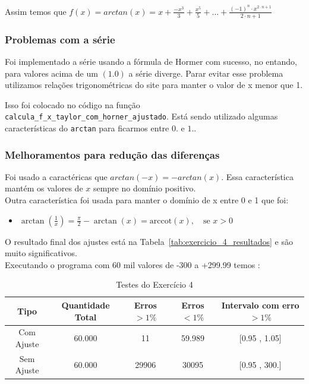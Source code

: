 Assim temos que $f(x) = arctan(x) = x + \frac{-x^3}{3} + \frac{x^5}{5} + ... + \frac{(-1)^n \cdot x^{2 \cdot n + 1}}{2 \cdot n + 1} $

\subsubsection{Problemas com a série}

Foi implementado a série usando a fórmula de Hormer com sucesso, no entando, para valores acima de um $(1.0)$ a série diverge.
Parar evitar esse problema utilizamos relações trigonométricas do site \cite{site-geek} para manter o valor de x menor que 1.

Isso foi colocado no código na função \texttt{calcula\_f\_x\_taylor\_com\_horner\_ajustado}. Está sendo utilizado algumas características do \texttt{arctan} para ficarmos entre $0.$ e $1.$.

\subsubsection{Melhoramentos para redução das diferenças}
\label{sec:melhoramentos-serie-arctan}
Foi usado a caractéricas que $arctan(-x) = -arctan(x)$. Essa característica mantém os valores de $x$ sempre no domínio positivo.\\
Outra característica foi usada para manter o domínio de x entre 0 e 1 que foi:
\begin{itemize}
    \item[] $\arctan\left(\frac{1}{x}\right) = \frac{\pi}{2} - \arctan(x) = \mathrm{arccot}(x), \quad \text{se } x > 0$
\end{itemize}

O resultado final dos ajustes está na Tabela~\ref{tab:exercicio_4_resultados} e são muito significativos.\\

Executando o programa com 60 mil valores de -300 a +299.99 temos :

\begin{table}[h!]
    \centering
    \caption{Testes do Exercício 4}
    \label{tab:exercicio_4_critica_1}
    \begin{tabular}{|c|c|c|c|c|}
        \hline
        \textbf{Tipo} & \textbf{Quantidade Total} & \textbf{Erros $>1\%$} & \textbf{Erros $<1\%$} & \textbf{Intervalo com erro $>1 \%$} \\
        \hline
        Com Ajuste & 60.000 & 11 & 59.989 & [0.95 , 1.05] \\
        Sem Ajuste & 60.000 & 29906 & 30095 & [0.95 , 300.] \\
        \hline
    \end{tabular}
\end{table}

